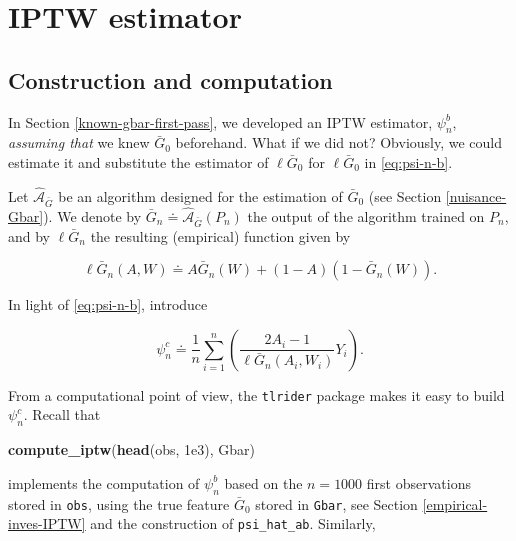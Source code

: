 \documentclass[11pt,openright,twoside]{book}
\newenvironment{Shaded}{\begin{snugshade}}{\end{snugshade}}
\newcommand{\FloatTok}[1]{\textcolor[rgb]{0.00,0.00,0.81}{#1}}
\newcommand{\KeywordTok}[1]{\textcolor[rgb]{0.13,0.29,0.53}{\textbf{#1}}}
\newcommand{\NormalTok}[1]{#1}
\newcommand{\Algo}{\widehat{\mathcal{A}}}
\newcommand{\defq}{\doteq}
\newcommand{\Gbar}{\bar{G}}
\theoremstyle{definition}
\theoremstyle{definition}
\theoremstyle{definition}
\theoremstyle{remark}
\begin{document}
\hypertarget{known-gbar-second-pass}{%
\section{IPTW estimator}\label{known-gbar-second-pass}}

\hypertarget{unknown-gbar-constr}{%
\subsection{Construction and computation}\label{unknown-gbar-constr}}

In Section \ref{known-gbar-first-pass}, we developed an IPTW estimator,
\(\psi_{n}^{b}\), \emph{assuming that} we knew \(\Gbar_{0}\) beforehand. What if we
did not? Obviously, we could estimate it and substitute the estimator of
\(\ell\Gbar_{0}\) for \(\ell\Gbar_{0}\) in \eqref{eq:psi-n-b}.

Let \(\Algo_{\Gbar}\) be an algorithm designed for the estimation of \(\Gbar_{0}\)
(see Section \ref{nuisance-Gbar}). We denote by \(\Gbar_{n} \defq \Algo_{\Gbar}(P_{n})\) the output of the algorithm trained on \(P_{n}\), and by
\(\ell\Gbar_{n}\) the resulting (empirical) function given by

\begin{equation*}
\ell\Gbar_{n}(A,W) \defq A \Gbar_{n}(W) + (1-A) (1 - \Gbar_{n}(W)).
\end{equation*}

In light of \eqref{eq:psi-n-b}, introduce

\begin{equation*}
\psi_{n}^{c}   \defq   \frac{1}{n}    \sum_{i=1}^{n}   \left(\frac{2A_{i}   -
1}{\ell\Gbar_{n}(A_{i}, W_{i})} Y_{i}\right).
\end{equation*}

From a computational point of view, the \texttt{tlrider} package makes it easy to
build \(\psi_{n}^{c}\). Recall that

\begin{Shaded}
\begin{Highlighting}[]
\KeywordTok{compute_iptw}\NormalTok{(}\KeywordTok{head}\NormalTok{(obs, }\FloatTok{1e3}\NormalTok{), Gbar)}
\end{Highlighting}
\end{Shaded}

implements the computation of \(\psi_{n}^{b}\) based on the \(n=1000\) first
observations stored in \texttt{obs}, using the true feature \(\Gbar_{0}\) stored in
\texttt{Gbar}, see Section \ref{empirical-inves-IPTW} and the construction of
\texttt{psi\_hat\_ab}. Similarly,
\end{document}
